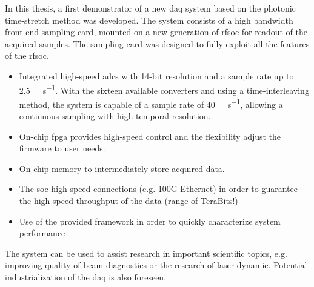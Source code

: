 In this thesis, a first demonstrator of a new \gls{daq} system based on the photonic time-stretch method was developed.
The system consists of a high bandwidth front-end sampling card, mounted on a new generation of \gls{rfsoc} for readout of the acquired samples. 
The sampling card was designed to fully exploit all the features of the \gls{rfsoc}. 
\begin{itemize}
	\item Integrated high-speed \glspl{adc} with 14-bit resolution and a sample rate up to \SI{2.5}{\giga \sample \per \second}. With the sixteen available converters and using a time-interleaving method, the system is capable of a sample rate of \SI{40}{\giga \sample \per \second}, allowing a continuous sampling with high temporal resolution.
	\item On-chip \gls{fpga} provides high-speed control and the flexibility adjust the firmware to user needs.
	\item On-chip memory to intermediately store acquired data.
	\item The \gls{soc} high-speed connections (e.g. 100G-Ethernet) in order to guarantee the high-speed throughput of the data (range of TeraBits!)
	\item Use of the provided framework in order to quickly characterize system performance
\end{itemize}

The system can be used to assist research in important scientific topics, e.g. improving quality of beam diagnostics or the research of laser dynamic.
Potential industrialization of the \gls{daq} is also foreseen. 


